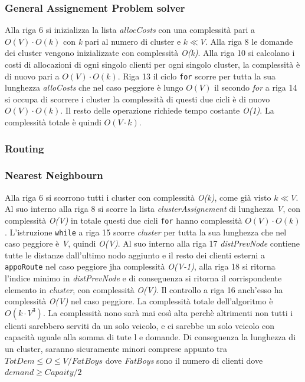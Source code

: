 \documentclass[]{article}
\begin{document}
\subsubsection{General Assignement Problem solver}
Alla riga 6 si inizializza la lista \textit{allocCosts} con una complessità  pari a \emph{$O(V) \cdot O(k)$} con \emph{k} pari al numero di cluster e \emph{$ k \ll V $}. Alla riga 8 le domande dei cluster vengono inizializzate con complessità \emph{O(k)}. Alla riga 10 si calcolano i costi di allocazioni di ogni singolo clienti per ogni singolo cluster, la complessità è di nuovo  pari a \emph{$O(V) \cdot O(k)$}. Riga 13 il ciclo \texttt{for} scorre per tutta la sua lunghezza \textit{alloCosts} che nel caso peggiore è lungo \emph{$O(V)$} il secondo \emph{for} a riga 14 si occupa di scorrere i cluster la complessità di questi due cicli è di nuovo \emph{$O(V) \cdot O(k)$}. Il resto delle operazione richiede tempo costante \emph{O(1)}. La complessità totale è quindi \emph{$O(V \cdot k)$}.


\subsubsection{Routing}
 
\subsubsection{Nearest Neighbourn}
Alla riga 6 si scorrono tutti i cluster con complessità \emph{O(k)}, come già visto  \emph{$ k \ll V $}. Al suo interno  alla riga 8 si scorre la lista \textit{clusterAssignement} di lunghezza \emph{V}, con complessità \emph{O(V)} in totale questi due cicli \texttt{for} hanno complessità \emph{$O(V) \cdot O(k)$}.
L'istruzione \texttt{while} a riga 15 scorre \textit{cluster} per tutta la sua lunghezza che nel caso peggiore è \emph{V}, quindi \emph{O(V)}. Al suo interno alla riga 17 \textit{distPrevNode} contiene tutte le distanze dall'ultimo nodo aggiunto e il resto dei clienti esterni a \texttt{appoRoute} nel caso peggiore jha complessità \emph{O(V-1)}, alla riga 18 si ritorna l'indice minimo in \textit{distPrevNode} e di conseguenza si ritorna il corrispondente elemento in \textit{cluster}, con complessità \emph{O(V)}. Il controllo a riga 16 anch'esso ha complessità \emph{O(V)} nel caso peggiore. La complessità totale dell'algoritmo è 
\emph{$O(k \cdot V^3)$}. 
La complessità nono sarà mai così alta perchè altrimenti non tutti i clienti sarebbero serviti da un solo veicolo, e ci sarebbe un solo veicolo con capacità uguale alla somma di tute l e domande. Di conseguenza la lunghezza di un cluster, saranno sicuramente minori comprese appunto tra  \emph{$TotDem \leq O \leq V/FatBoys$ } dove \textit{FatBoys} sono il numero di clienti dove $demand \geq Capaity/2$
\end{document}
